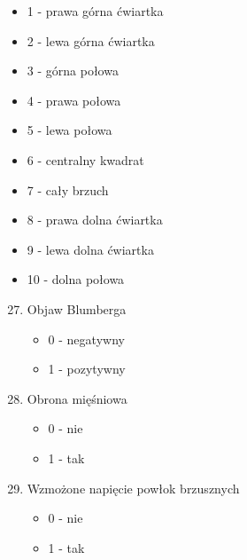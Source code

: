 \documentclass{report}
\begin{document}
\begin{itemize}
\begin{enumerate}
\begin{itemize}
                \item 1 - prawa górna ćwiartka
                \item 2 - lewa górna ćwiartka
                \item 3 - górna połowa
                \item 4 - prawa połowa
                \item 5 - lewa połowa
                \item 6 - centralny kwadrat
                \item 7 - cały brzuch
                \item 8 - prawa dolna ćwiartka
                \item 9 - lewa dolna ćwiartka
                \item 10 - dolna połowa
            \end{itemize}
        \end{enumerate}
        \begin{enumerate}
            \setcounter{enumi}{26}
            \item Objaw Blumberga
            \begin{itemize}
                \item 0 - negatywny
                \item 1 - pozytywny
            \end{itemize}
        \end{enumerate}
        \begin{enumerate}
            \setcounter{enumi}{27}
            \item Obrona mięśniowa
            \begin{itemize}
                \item 0 - nie
                \item 1 - tak
            \end{itemize}
        \end{enumerate}
        \begin{enumerate}
            \setcounter{enumi}{28}
            \item Wzmożone napięcie powłok brzusznych
            \begin{itemize}
                \item 0 - nie
                \item 1 - tak
            \end{itemize}
        \end{enumerate}
        \begin{enumerate}
            \setcounter{enumi}{29}

\end{enumerate}
\end{itemize}
\end{document}
